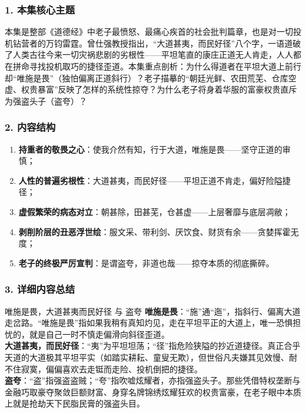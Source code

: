 \subsubsection{1. 本集核心主题}
本集是整部《道德经》中老子最愤怒、最痛心疾首的社会批判篇章，也是对一切投机钻营者的万钧雷霆。曾仕强教授指出，“大道甚夷，而民好径”八个字，一语道破了人类古往今来一切灾祸悲剧的劣根性——平坦笔直的康庄正道无人肯走，人人都在拼命寻找投机取巧的捷径歪道。本集重点剖析：为什么得道者在平坦大道上前行却“唯施是畏”（独怕偏离正道斜行）？老子描摹的“朝廷光鲜、农田荒芜、仓库空虚、权贵暴富”反映了怎样的系统性掠夺？为什么老子将身着华服的富豪权贵直斥为强盗头子（盗夸）？

\subsubsection{2. 内容结构}
\begin{enumerate}
    \item \textbf{持重者的敬畏之心}：使我介然有知，行于大道，唯施是畏——坚守正道的审慎；
    \item \textbf{人性的普遍劣根性}：大道甚夷，而民好径——平坦正道不肯走，偏好险隘捷径；
    \item \textbf{虚假繁荣的病态对立}：朝甚除，田甚芜，仓甚虚——上层奢靡与底层凋敝；
    \item \textbf{剥削阶层的丑恶浮世绘}：服文采、带利剑、厌饮食、财货有余——贪婪挥霍无度；
    \item \textbf{老子的终极严厉宣判}：是谓盗夸，非道也哉——掠夺本质的彻底撕碎。
\end{enumerate}

\subsubsection{3. 详细内容总结}

\begin{ConceptBox}{唯施是畏，大道甚夷而民好径 与 盗夸}
\textbf{唯施是畏}：“施”通“迤”，指斜行、偏离大道走岔路。“唯施是畏”指如果我稍有真知灼见，走在平坦平正的大道上，唯一恐惧担忧的，就是自己一时不慎走偏滑向斜径歪道。\\
\textbf{大道甚夷，而民好径}：“夷”为平坦坦荡；“径”指危险狭隘的抄近道捷径。真正合乎天道的大道极其平坦平实（如踏实耕耘、童叟无欺），但世俗凡夫嫌其见效慢、耐不住寂寞，偏偏喜欢去走铤而走险、投机倒把的捷径。\\
\textbf{盗夸}：“盗”指强盗盗贼；“夸”指吹嘘炫耀者，亦指强盗头子。那些凭借特权垄断与金融巧取豪夺聚敛巨额财富、身穿名牌锦绣炫耀狂欢的权贵富豪，在老子眼中本质上就是抢劫天下民脂民膏的强盗头目。
\end{ConceptBox}

